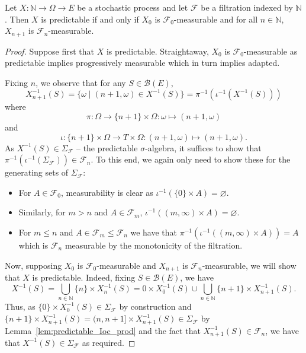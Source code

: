 \begin{lemma}\label{lem:predictable_nat_iff}
  \mathlibok
Let $X : \mathbb{N} \to \Omega \to E$ be a stochastic process and let $\mathcal{F}$ be a filtration indexed by $\mathbb{N}$.
Then $X$ is predictable if and only if $X_0$ is $\mathcal{F}_0$-measurable and for all $n \in \mathbb{N}$, $X_{n+1}$ is $\mathcal{F}_n$-measurable.
\end{lemma}


\begin{proof}\leanok
Suppose first that $X$ is predictable. Straightaway, $X_0$ is $\mathcal{F}_0$-measurable as predictable implies progressively measurable which in turn implies adapted.

Fixing $n$, we observe that for any $S \in \mathcal{B}(E)$,
$$X_{n + 1}^{-1}(S) = \{\omega \mid (n + 1, \omega) \in X^{-1}(S)\} = \pi^{-1}(\iota^{-1}(X^{-1}(S)))$$
where
$$\pi : \Omega \to \{n + 1\} \times \Omega : \omega \mapsto (n + 1, \omega)$$
and
$$\iota : \{n + 1\} \times \Omega \to T \times \Omega : (n + 1, \omega) \mapsto (n + 1, \omega).$$
As $X^{-1}(S) \in \Sigma_{\mathcal{F}}$ -- the predictable $\sigma$-algebra, it suffices to show that $\pi^{-1}(\iota^{-1}(\Sigma_{\mathcal{F}})) \in \mathcal{F}_n$. To this end, we again only need to show these for the generating sets of $\Sigma_{\mathcal{F}}$:
\begin{itemize}
    \item For $A \in \mathcal{F}_0$, measurability is clear as $\iota^{-1}(\{0\} \times A) = \varnothing$.
    \item Similarly, for $m > n$ and $A \in \mathcal{F}_m$, $\iota^{-1}((m, \infty) \times A) = \varnothing$.
    \item For $m \le n$ and $A \in \mathcal{F}_m \le \mathcal{F}_n$ we have that $\pi^{-1}(\iota^{-1}((m, \infty) \times A)) = A$ which is $\mathcal{F}_n$ measurable by the monotonicity of the filtration.
\end{itemize}

Now, supposing $X_0$ is $\mathcal{F}_0$-measurable and $X_{n + 1}$ is $\mathcal{F}_n$-measurable, we will show that $X$ is predictable. Indeed, fixing $S \in \mathcal{B}(E)$, we have
$$X^{-1}(S) = \bigcup_{n \in \mathbb{N}} \{n\} \times X_n^{-1}(S) = {0} \times X_0^{-1}(S) \cup \bigcup_{n \in \mathbb{N}} \{n + 1\} \times X_{n + 1}^{-1}(S).$$
Thus, as $\{0\} \times X_0^{-1}(S) \in \Sigma_{\mathcal{F}}$ by construction and $\{n + 1\} \times X_{n + 1}^{-1}(S) = (n, n + 1] \times X_{n + 1}^{-1}(S) \in \Sigma_{\mathcal{F}}$ by Lemma~\ref{lem:predictable_Ioc_prod} and the fact that $X_{n + 1}^{-1}(S) \in \mathcal{F}_n$, we have that $X^{-1}(S) \in \Sigma_{\mathcal{F}}$ as required.
\end{proof}




